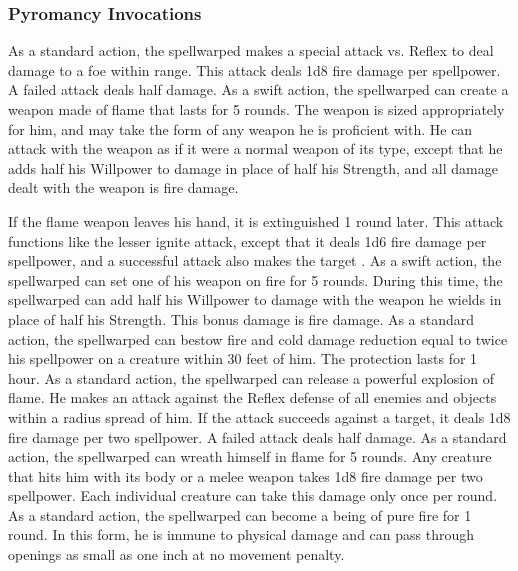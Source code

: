 \subsubsection{Pyromancy Invocations}
As a standard action, the spellwarped makes a special attack vs. Reflex to deal damage to a foe within \rngclose range.
This attack deals 1d8 fire damage  per spellpower.
A failed attack deals half damage.
As a swift action, the spellwarped can create a weapon made of flame that lasts for 5 rounds.
The weapon is sized appropriately for him, and may take the form of any weapon he is proficient with.
He can attack with the weapon as if it were a normal weapon of its type, except that he adds half his Willpower to damage in place of half his Strength, and all damage dealt with the weapon is fire damage.
\par If the flame weapon leaves his hand, it is extinguished 1 round later.
This attack functions like the lesser ignite attack, except that it deals 1d6 fire damage per spellpower, and a successful attack also makes the target \ignited.
As a swift action, the spellwarped can set one of his weapon on fire for 5 rounds.
During this time, the spellwarped can add half his Willpower to damage with the weapon he wields in place of half his Strength.
This bonus damage is fire damage.
As a standard action, the spellwarped can bestow fire and cold damage reduction equal to twice his spellpower on a creature within 30 feet of him.
The protection lasts for 1 hour.
As a standard action, the spellwarped can release a powerful explosion of flame.
He makes an attack against the Reflex defense of all enemies and objects within a \areamed radius spread of him.
If the attack succeeds against a target, it deals 1d8 fire damage per two spellpower.
A failed attack deals half damage.
As a standard action, the spellwarped can wreath himself in flame for 5 rounds.
Any creature that hits him with its body or a melee weapon takes 1d8 fire damage per two spellpower.
Each individual creature can take this damage only once per round.
As a standard action, the spellwarped can become a being of pure fire for 1 round.
In this form, he is immune to physical damage and can pass through openings as small as one inch at no movement penalty.
